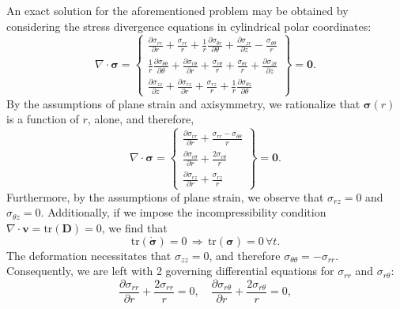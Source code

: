 An exact solution for the aforementioned problem may be obtained by considering the stress divergence equations in cylindrical polar coordinates:
\begin{equation}
  \nabla \cdot \boldsymbol{\sigma} = \left\{ \begin{array}{c} \frac{\partial \sigma_{rr}}{\partial r} + \frac{\sigma_{rr}}{r} + \frac{1}{r} \frac{\partial \sigma_{\theta r}}{\partial \theta} + \frac{\partial \sigma_{z r}}{\partial z} - \frac{\sigma_{\theta \theta}}{r} \\
    \frac{1}{r} \frac{\partial \sigma_{\theta \theta}}{\partial \theta} + \frac{\partial \sigma_{r\theta}}{\partial r} + \frac{\sigma_{r\theta}}{r} + \frac{\sigma_{\theta r}}{r} + \frac{\partial \sigma_{z \theta}}{\partial z} \\
    \frac{\partial \sigma_{z z}}{\partial z} + \frac{\partial \sigma_{r z}}{\partial r} + \frac{\sigma_{r z}}{r} + \frac{1}{r} \frac{\partial \sigma_{\theta z}}{\partial \theta} \end{array} \right\} = \mathbf{0}.
\end{equation}
By the assumptions of plane strain and axisymmetry, we rationalize that $\boldsymbol{\sigma} (r)$ is a function of $r$, alone, and therefore,
\begin{equation}
  \nabla \cdot \boldsymbol{\sigma} = \left\{ \begin{array}{c} \frac{\partial \sigma_{rr}}{\partial r} + \frac{\sigma_{rr} - \sigma_{\theta \theta}}{r} \\
    \frac{\partial \sigma_{r\theta}}{\partial r} + \frac{2 \sigma_{r\theta}}{r} \\
    \frac{\partial \sigma_{r z}}{\partial r} + \frac{\sigma_{r z}}{r} \end{array} \right\} = \mathbf{0}.
\end{equation}
Furthermore, by the assumptions of plane strain, we observe that $\sigma_{rz} = 0$ and $\sigma_{\theta z} = 0$. Additionally, if we impose the incompressibility condition $\nabla \cdot \mathbf{v} = \text{tr} (\mathbf{D}) = 0$, we find that
\begin{equation}
  \text{tr} (\dot{\boldsymbol{\sigma}}) = 0 \, \Rightarrow \, \text{tr} (\boldsymbol{\sigma}) = 0 \, \forall t.
\end{equation}
The deformation necessitates that $\sigma_{zz} = 0$, and therefore $\sigma_{\theta \theta} = - \sigma_{rr}$. Consequently, we are left with 2 governing differential equations for $\sigma_{rr}$ and $\sigma_{r \theta}$:
\begin{equation}
  \frac{\partial \sigma_{rr}}{\partial r} + \frac{2 \sigma_{rr}}{r} = 0, \quad \frac{\partial \sigma_{r\theta}}{\partial r} + \frac{2 \sigma_{r\theta}}{r} = 0,
\end{equation}
